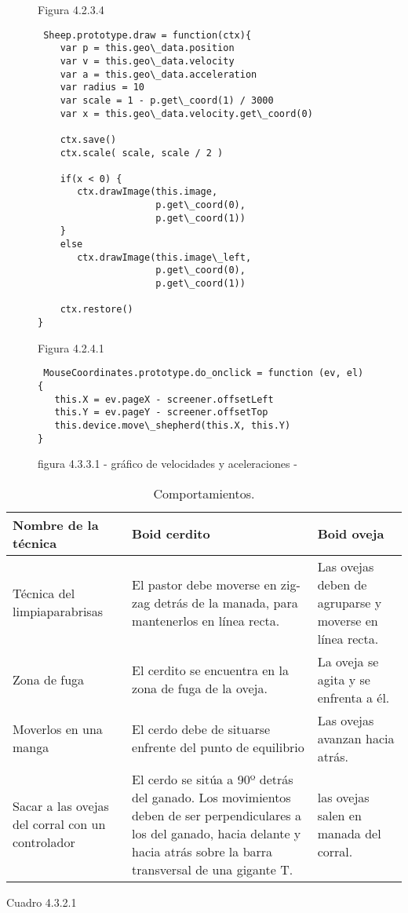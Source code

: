 \begin{figure}[p]
Figura 4.2.3.4
\begin{verbatim}
 Sheep.prototype.draw = function(ctx){
    var p = this.geo\_data.position
    var v = this.geo\_data.velocity
    var a = this.geo\_data.acceleration
    var radius = 10
    var scale = 1 - p.get\_coord(1) / 3000
    var x = this.geo\_data.velocity.get\_coord(0)

    ctx.save()
    ctx.scale( scale, scale / 2 )

    if(x < 0) {
       ctx.drawImage(this.image, 
                     p.get\_coord(0),
                     p.get\_coord(1))
    }
    else
       ctx.drawImage(this.image\_left, 
                     p.get\_coord(0),
                     p.get\_coord(1))

    ctx.restore()
}
\end{verbatim}
\end{figure}


\begin{figure}[p]
Figura 4.2.4.1
\begin{verbatim}
 MouseCoordinates.prototype.do_onclick = function (ev, el) {
   this.X = ev.pageX - screener.offsetLeft
   this.Y = ev.pageY - screener.offsetTop
   this.device.move\_shepherd(this.X, this.Y)
}
\end{verbatim}
\end{figure}


\begin{figure}[p]
figura 4.3.3.1
- gráfico de velocidades y aceleraciones -
\end{figure}


\begin{table}[p]
\caption{Comportamientos.}
\begin{tabular}{| p{4cm} | p{7cm} | p{4cm} |} %

\hline\hline %
Nombre de la técnica & Boid cerdito & Boid oveja \\ [0.5ex] %
\hline %
Técnica del limpiaparabrisas & El pastor debe moverse en zig-zag detrás de la manada, para mantenerlos en línea recta. & Las ovejas deben de agruparse y moverse en línea recta.\\
Zona de fuga & El cerdito se encuentra en la zona de fuga de la oveja. & La oveja se agita y se enfrenta a él. \\
Moverlos en una manga & El cerdo debe de situarse enfrente del punto de equilibrio & Las ovejas avanzan hacia atrás. \\
Sacar a las ovejas del corral con un controlador & El cerdo se sitúa  a 90º detrás del ganado. Los movimientos deben de ser perpendiculares a los del ganado, hacia delante y hacia atrás sobre la barra transversal de una gigante T. & las ovejas salen en 
manada del corral. \\ [1ex] %
\hline %
\end{tabular}
\label{table:nonlin} %
\end{table}
Cuadro 4.3.2.1


